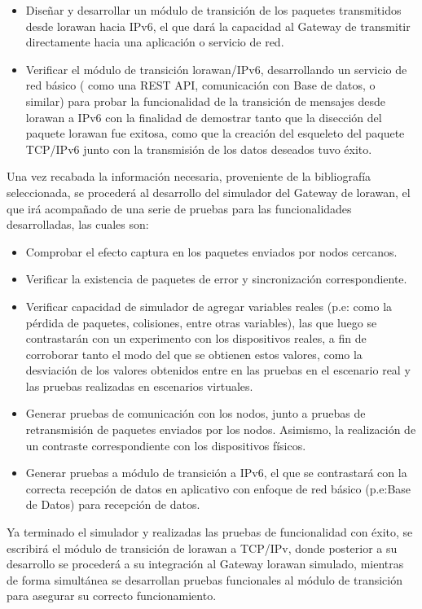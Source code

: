 \begin{justify}
\begin{itemize}
\item Diseñar y desarrollar un módulo de transición de los paquetes transmitidos desde \gls{lorawan} hacia IPv6, el que dará la capacidad al Gateway de transmitir directamente hacia una aplicación o servicio de red.
\item Verificar el módulo de transición \gls{lorawan}/IPv6, desarrollando un servicio de red básico ( como una REST API, comunicación con Base de datos, o similar) para probar la funcionalidad de la transición de mensajes desde \gls{lorawan} a IPv6 con la finalidad de demostrar tanto que la disección del paquete \gls{lorawan} fue exitosa, como que la creación del esqueleto del paquete TCP/IPv6 junto con la transmisión de los datos deseados tuvo éxito.
\end{itemize}

Una vez recabada la información necesaria, proveniente de la bibliografía seleccionada, se procederá al desarrollo del simulador del Gateway de \gls{lorawan}, el que irá acompañado de una serie de pruebas para las funcionalidades desarrolladas, las cuales son:\\
\begin{itemize}
\item Comprobar el efecto captura en los paquetes enviados por nodos cercanos. 
\item Verificar la existencia de paquetes de error y sincronización correspondiente.
\item Verificar capacidad de simulador de agregar variables reales (p.e: como la pérdida de paquetes, colisiones, entre otras variables), las que luego se contrastarán con un experimento con los dispositivos reales, a fin de corroborar tanto el modo del que se obtienen estos valores, como la desviación de los valores obtenidos entre en las pruebas en el escenario real y las pruebas realizadas en escenarios virtuales.
\item Generar pruebas de comunicación con los nodos, junto a pruebas de retransmisión de paquetes enviados por los nodos. Asimismo, la realización de un contraste correspondiente con los dispositivos físicos.
\item Generar pruebas a módulo de transición a IPv6, el que se contrastará con la correcta recepción de datos en aplicativo con enfoque de red básico (p.e:Base de Datos) para recepción de datos.
\end{itemize}
Ya terminado el simulador y realizadas las pruebas de funcionalidad con éxito, se escribirá el módulo de transición de \gls{lorawan} a TCP/IPv, donde posterior a su desarrollo se procederá a su integración al Gateway \gls{lorawan} simulado, mientras de forma simultánea se desarrollan pruebas funcionales al módulo de transición para asegurar su correcto funcionamiento.
\end{justify}